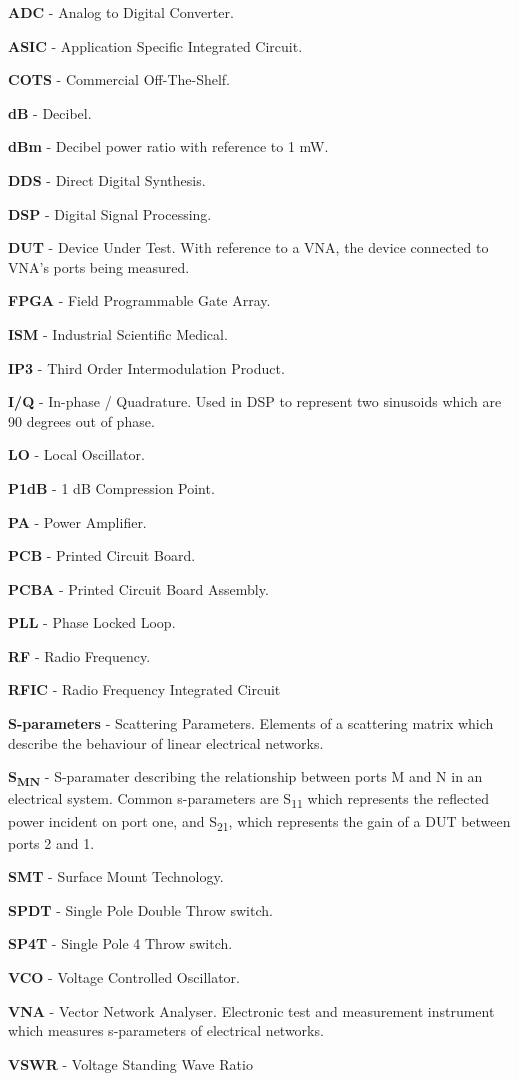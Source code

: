 \textbf{ADC} - Analog to Digital Converter.

\textbf{ASIC} - Application Specific Integrated Circuit.

\textbf{COTS} - Commercial Off-The-Shelf.

\textbf{dB} - Decibel.

\textbf{dBm} - Decibel power ratio with reference to 1 mW.

\textbf{DDS} - Direct Digital Synthesis. 

\textbf{DSP} - Digital Signal Processing.

\textbf{DUT} - Device Under Test. With reference to a VNA, the device connected to VNA's ports being measured. 

\textbf{FPGA} - Field Programmable Gate Array.

\textbf{ISM} - Industrial Scientific Medical.

\textbf{IP3} - Third Order Intermodulation Product.

\textbf{I/Q} - In-phase / Quadrature. Used in DSP to represent two sinusoids which are 90 degrees out of phase. 

\textbf{LO} - Local Oscillator. 

\textbf{P1dB} - 1 dB Compression Point. 

\textbf{PA} - Power Amplifier.

\textbf{PCB} - Printed Circuit Board. 

\textbf{PCBA} - Printed Circuit Board Assembly.

\textbf{PLL} - Phase Locked Loop.

\textbf{RF} - Radio Frequency.

\textbf{RFIC} - Radio Frequency Integrated Circuit

\textbf{S-parameters} - Scattering Parameters. Elements of a scattering matrix which describe the behaviour of linear electrical networks. 

\textbf{S\textsubscript{MN}} - S-paramater describing the relationship between ports M and N in an electrical system. Common s-parameters are S\textsubscript{11} which represents the reflected power incident on port one, and S\textsubscript{21}, which represents the gain of a DUT between ports 2 and 1. 

\textbf{SMT} - Surface Mount Technology.

\textbf{SPDT} - Single Pole Double Throw switch. 

\textbf{SP4T} - Single Pole 4 Throw switch. 

\textbf{VCO} - Voltage Controlled Oscillator.

\textbf{VNA} - Vector Network Analyser. Electronic test and measurement instrument which measures s-parameters of electrical networks. 

\textbf{VSWR} - Voltage Standing Wave Ratio
